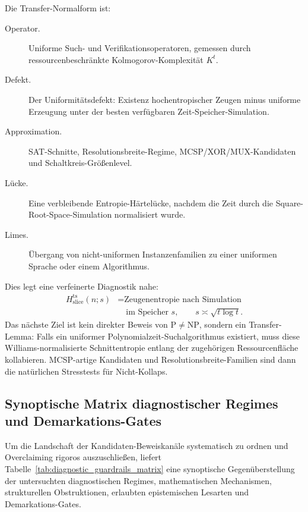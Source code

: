 \documentclass[aps,prd,twocolumn,superscriptaddress,nofootinbib]{revtex4-2}
\theoremstyle{definition}
\theoremstyle{remark}
\begin{document}
Die Transfer-Normalform ist:
\begin{description}
  \item[Operator.] Uniforme Such- und Verifikationsoperatoren, gemessen durch ressourcenbeschränkte Kolmogorov-Komplexität $K^t$.
  \item[Defekt.] Der Uniformitätsdefekt: Existenz hochentropischer Zeugen minus uniforme Erzeugung unter der besten verfügbaren Zeit-Speicher-Simulation.
  \item[Approximation.] SAT-Schnitte, Resolutionsbreite-Regime, MCSP/XOR/MUX-Kandidaten und Schaltkreis-Größenlevel.
  \item[Lücke.] Eine verbleibende Entropie-Härtelücke, nachdem die Zeit durch die Square-Root-Space-Simulation normalisiert wurde.
  \item[Limes.] Übergang von nicht-uniformen Instanzenfamilien zu einer uniformen Sprache oder einem Algorithmus.
\end{description}

Dies legt eine verfeinerte Diagnostik nahe:
\[
\begin{aligned}
  H_{\mathrm{slice}}^{\mathrm{ts}}(n;s)
  &= \text{Zeugenentropie nach Simulation}\\
  &\quad \text{im Speicher }s,\qquad s \asymp \sqrt{t\log t}.
\end{aligned}
\]
Das nächste Ziel ist kein direkter Beweis von $\mathrm{P}\ne\mathrm{NP}$, sondern ein Transfer-Lemma: Falls ein uniformer Polynomialzeit-Suchalgorithmus existiert, muss diese Williams-normalisierte Schnittentropie entlang der zugehörigen Ressourcenfläche kollabieren. MCSP-artige Kandidaten und Resolutionsbreite-Familien sind dann die natürlichen Stresstests für Nicht-Kollaps.

\subsection{Synoptische Matrix diagnostischer Regimes und Demarkations-Gates}
\label{subsec:diagnostic_matrix}

Um die Landschaft der Kandidaten-Beweiskanäle systematisch zu ordnen und Overclaiming rigoros auszuschließen, liefert Tabelle~\ref{tab:diagnostic_guardrails_matrix} eine synoptische Gegenüberstellung der untersuchten diagnostischen Regimes, mathematischen Mechanismen, strukturellen Obstruktionen, erlaubten epistemischen Lesarten und Demarkations-Gates.
\end{document}
